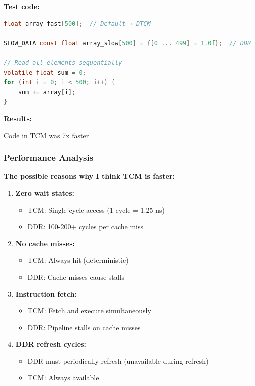 \documentclass[12pt,a4paper]{report}
\begin{document}
\textbf{Test code:}

\begin{lstlisting}[language=c]
float array_fast[500];  // Default → DTCM

SLOW_DATA const float array_slow[500] = {[0 ... 499] = 1.0f};  // DDR

// Read all elements sequentially
volatile float sum = 0;
for (int i = 0; i < 500; i++) {
    sum += array[i];
}
\end{lstlisting}

\textbf{Results:}
\begin{center}
Code in TCM  was 7x faster
\end{center}

\subsubsection{Performance Analysis}

\textbf{The possible reasons why I think TCM is faster:}

\begin{enumerate}
    \item \textbf{Zero wait states:}
    \begin{itemize}
        \item TCM: Single-cycle access (1 cycle = 1.25 ns)
        \item DDR: 100-200+ cycles per cache miss
    \end{itemize}
    
    \item \textbf{No cache misses:}
    \begin{itemize}
        \item TCM: Always hit (deterministic)
        \item DDR: Cache misses cause stalls
    \end{itemize}
    
    \item \textbf{Instruction fetch:}
    \begin{itemize}
        \item TCM: Fetch and execute simultaneously
        \item DDR: Pipeline stalls on cache misses
    \end{itemize}
    
    \item \textbf{DDR refresh cycles:}
    \begin{itemize}
        \item DDR must periodically refresh (unavailable during refresh)
        \item TCM: Always available
    \end{itemize}
\end{enumerate}
\end{document}

